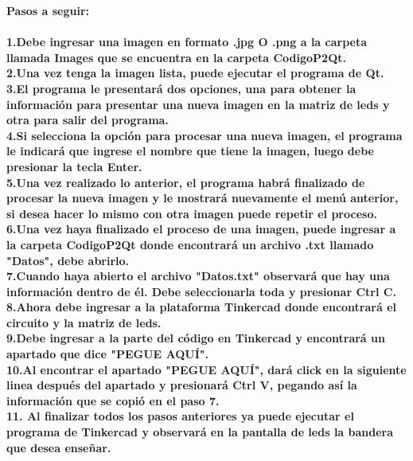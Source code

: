\documentclass{article}
\begin{document}
\begin{titlepage}
    \Huge
    \textbf{Pasos a seguir:\\\\}
    \large
    \textbf{
    1.Debe ingresar una imagen en formato .jpg O .png a la carpeta llamada Images que se encuentra en la carpeta CodigoP2Qt.\\
    2.Una vez tenga la imagen lista, puede ejecutar el programa de Qt.\\
    3.El programa le presentará dos opciones, una para obtener la información para presentar una nueva imagen en la matriz de leds y otra para salir del programa.\\
    4.Si selecciona la opción para procesar una nueva imagen, el programa le indicará que ingrese el nombre que tiene la imagen, luego debe presionar la tecla Enter.\\
    5.Una vez realizado lo anterior, el programa habrá finalizado de procesar la nueva imagen y le mostrará nuevamente el menú anterior, si desea hacer lo mismo con otra imagen puede repetir el proceso.\\
    6.Una vez haya finalizado el proceso de una imagen, puede ingresar a la carpeta CodigoP2Qt donde encontrará un archivo .txt llamado "Datos", debe abrirlo.\\
    7.Cuando haya abierto el archivo "Datos.txt" observará que hay una información dentro de él. Debe seleccionarla toda y presionar Ctrl C.\\ 
    8.Ahora debe ingresar a la plataforma Tinkercad donde encontrará el circuito y la matriz de leds.\\
    9.Debe ingresar a la parte del código en Tinkercad y encontrará un apartado que dice "PEGUE AQUÍ".\\
    10.Al encontrar el apartado "PEGUE AQUÍ", dará click en la siguiente linea después del apartado y presionará Ctrl V, pegando así la información que se copió en el paso 7.\\
    11. Al finalizar todos los pasos anteriores ya puede ejecutar el programa de Tinkercad y observará en la pantalla de leds la bandera que desea enseñar.\\
    }
    
\end{titlepage}
\end{document}
